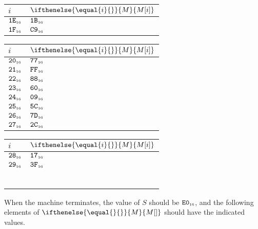\documentclass[a4paper,12pt]{article}
\makeatletter
\newcommand{\num}[1]{\texttt{#1}}
\newcommand{\hex}[1]{\num{#1}_{\textup{\tiny 16}}}
\newcommand{\MEM}[1]{\ifthenelse{\equal{#1}{}}{M}{M[#1]}}
\newcommand{\SP}{S}
\newenvironment{memtable}{%
  \begin{trivlist}
    \item
    }{%
    \end{trivlist}}
\newenvironment{memcolumn}{%
  \begin{tabular}{@{}ll@{}}
    $i$ & $\MEM{i}$ \\
    \hline}
    {%
    \hline
  \end{tabular}}
\newcommand{\memspace}{\qquad}
\makeatother
\begin{document}
\begin{memtable}
\begin{memcolumn}
    $\hex{1E}$ & $\hex{1B}$ \\
    $\hex{1F}$ & $\hex{C9}$ \\
  \end{memcolumn}
  \memspace
  \begin{memcolumn}
    $\hex{20}$ & $\hex{77}$ \\
    $\hex{21}$ & $\hex{FF}$ \\
    $\hex{22}$ & $\hex{88}$ \\
    $\hex{23}$ & $\hex{60}$ \\
    $\hex{24}$ & $\hex{09}$ \\
    $\hex{25}$ & $\hex{5C}$ \\
    $\hex{26}$ & $\hex{7D}$ \\
    $\hex{27}$ & $\hex{2C}$ \\
  \end{memcolumn}
  \memspace
  \begin{memcolumn}
    $\hex{28}$ & $\hex{17}$ \\
    $\hex{29}$ & $\hex{3F}$ \\
    \\
    \\
    \\
    \\
    \\
    \\
  \end{memcolumn}
\end{memtable}
When the machine terminates, the value of $\SP$ should be $\hex{E0}$, and the following elements of $\MEM{}$ should have the indicated values.
\end{document}
